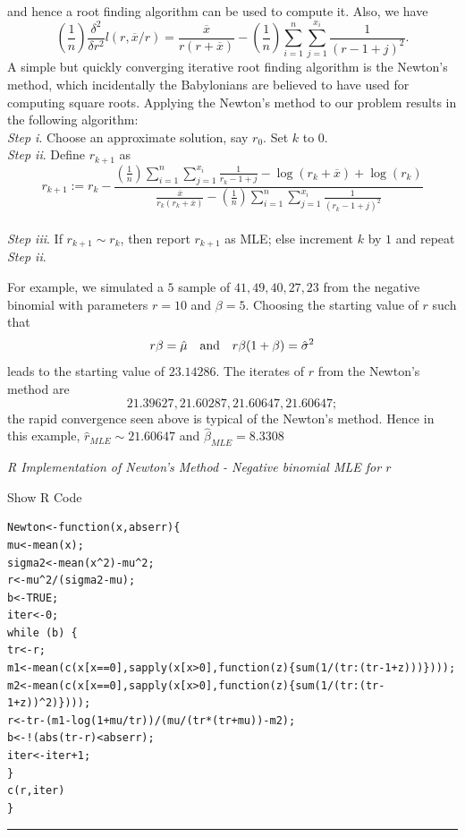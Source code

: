 \documentclass[]{book}
\theoremstyle{definition}
\theoremstyle{definition}
\theoremstyle{definition}
\theoremstyle{remark}
\begin{document}
and hence a root finding algorithm can be used to compute it. Also, we
have \[
\left(\frac{1}{n}\right)\frac{\delta^2}{\delta r^2}l(r,\overline{x}/r)=\frac{\overline{x}}{r(r+\overline{x})}-\left(\frac{1}{n}\right)\sum_{i=1}^n \sum_{j=1}^{x_i}\frac{1}{(r-1+j)^2}.
\] A simple but quickly converging iterative root finding algorithm is
the Newton's method, which incidentally the Babylonians are believed to
have used for computing square roots. Applying the Newton's method to
our problem results in the following algorithm:\\
 \emph{Step i}. Choose an approximate solution, say \(r_0\). Set \(k\)
to \(0\).\\
\emph{Step ii}. Define \(r_{k+1}\) as \[
r_{k+1}:= r_k - \frac{\left(\frac{1}{n}\right)\sum_{i=1}^n \sum_{j=1}^{x_i}\frac{1}{r_k-1+j} - \log(r_k+\overline{x}) + \log(r_k)}{\frac{\overline{x}}{r_k(r_k+\overline{x})}-\left(\frac{1}{n}\right)\sum_{i=1}^n \sum_{j=1}^{x_i}\frac{1}{(r_k-1+j)^2}}
\]\\
\emph{Step iii}. If \(r_{k+1}\sim r_k\), then report \(r_{k+1}\) as MLE;
else increment \(k\) by \(1\) and repeat \emph{Step ii}.

For example, we simulated a \(5\) sample of \(41, 49, 40, 27, 23\) from
the negative binomial with parameters \(r=10\) and \(\beta=5\). Choosing
the starting value of \(r\) such that \[
r\beta=\hat{\mu} \quad \hbox{and} \quad r\beta(1+\beta)=\hat{\sigma}^2
\] leads to the starting value of \(23.14286\). The iterates of \(r\)
from the Newton's method are \[
21.39627, 21.60287, 21.60647, 21.60647;
\] the rapid convergence seen above is typical of the Newton's method.
Hence in this example, \(\hat{r}_{MLE}\sim21.60647\) and
\(\hat{\beta}_{MLE}=8.3308\)

\emph{R Implementation of Newton's Method - Negative binomial MLE for
\(r\)}

Show R Code

\hypertarget{toggleCodeFreq.1}{}
\begin{verbatim}
Newton<-function(x,abserr){
mu<-mean(x);
sigma2<-mean(x^2)-mu^2;
r<-mu^2/(sigma2-mu);
b<-TRUE;
iter<-0;
while (b) {
tr<-r;
m1<-mean(c(x[x==0],sapply(x[x>0],function(z){sum(1/(tr:(tr-1+z)))})));
m2<-mean(c(x[x==0],sapply(x[x>0],function(z){sum(1/(tr:(tr-1+z))^2)})));
r<-tr-(m1-log(1+mu/tr))/(mu/(tr*(tr+mu))-m2);
b<-!(abs(tr-r)<abserr);
iter<-iter+1;
}
c(r,iter)
}
\end{verbatim}

\begin{center}\rule{0.5\linewidth}{\linethickness}\end{center}
\end{document}

